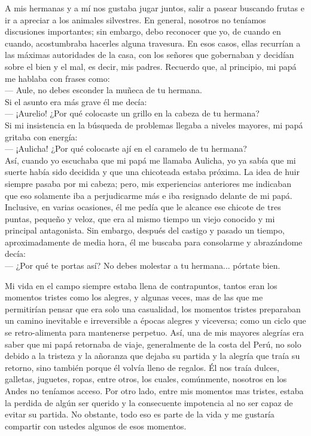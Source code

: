 A mis hermanas y a mí nos gustaba jugar juntos, salir a pasear buscando frutas e ir a apreciar a los animales silvestres. En general, nosotros no teníamos discusiones importantes; sin embargo, debo reconocer que yo, de cuando en cuando, acostumbraba hacerles alguna travesura.
En esos casos, ellas recurrían a las máximas autoridades de la casa, con los señores que gobernaban y decidían sobre el bien y el mal, es decir, mis padres. 
Recuerdo que, al principio, mi papá me hablaba con frases como:\\\indent
--- Aule, no debes esconder la muñeca de tu hermana.\\\indent
Si el asunto era más grave él me decía: \\\indent
--- ¡Aurelio! ¿Por qué colocaste un grillo en la cabeza de tu hermana?\\\indent
Si mi insistencia en la búsqueda de problemas llegaba a niveles mayores, mi papá gritaba con energía:\\\indent
--- ¡Aulicha! ¿Por qué colocaste ají en el caramelo de tu hermana?\\\indent
Así, cuando yo escuchaba que mi papá me llamaba Aulicha, yo ya sabía que mi suerte había sido decidida y que una chicoteada estaba próxima. La idea de huir siempre pasaba por mi cabeza; pero, mis experiencias anteriores me indicaban que eso solamente iba a perjudicarme más e iba resignado delante de mi papá. Inclusive, en varias ocasiones, él me pedía que le alcance ese chicote de tres puntas, pequeño y veloz, que era al mismo tiempo un viejo conocido y mi principal antagonista. 
Sin embargo, después del castigo y pasado un tiempo, aproximadamente de media hora,
él me buscaba para consolarme y abrazándome decía:\\\indent
--- ¿Por qué te portas así? No debes molestar a tu hermana... pórtate bien.

Mi vida en el campo siempre estaba llena de contrapuntos, tantos eran los momentos tristes como los alegres, y  algunas veces, mas de las que me permitirían pensar que era solo una casualidad, los momentos tristes preparaban un camino inevitable e irreversible a épocas alegres y viceversa; como un ciclo que se retro-alimenta para mantenerse perpetuo.
Así, una de mis mayores alegrías era saber que mi papá retornaba de viaje, generalmente de la costa del Perú, no solo debido a la tristeza y la añoranza que dejaba su partida y la alegría que traía su retorno, sino también porque él volvía lleno de regalos. 
Él nos traía dulces, galletas, juguetes, ropas, entre otros, los cuales, comúnmente, nosotros en los Andes no teníamos acceso.
Por otro lado, entre mis momentos mas tristes, estaba la perdida de algún ser querido y la consecuente impotencia al no ser capaz de evitar su partida.
No obstante, todo eso es parte de la vida y me gustaría compartir con ustedes algunos de esos momentos.





